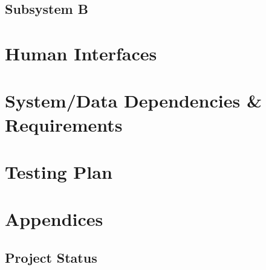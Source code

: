 \documentclass[12pt]{article}
\begin{document}
\subsection{Subsystem B}
\section{Human Interfaces}
\section{System/Data Dependencies \& Requirements}
\section{Testing Plan}
\section{Appendices}
\subsection{Project Status}



\end{document}
